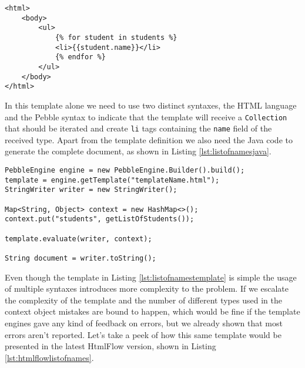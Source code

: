 \bigskip


\begin{minipage}{\linewidth}
\begin{lstlisting}[caption={List of Student Names Template - Pebble}, label={lst:listofnamestemplate}]
<html>
	<body>
	    <ul>
			{% for student in students %}
		  	<li>{{student.name}}</li>
			{% endfor %}
		</ul>  
  	</body>
</html>
\end{lstlisting}
\end{minipage} 

\noindent
In this template alone we need to use two distinct syntaxes, the \ac{HTML} language and the Pebble syntax to indicate that the template will receive a \texttt{Collection} that should be iterated  and create \texttt{li} tags containing the \texttt{name} field of the received type. Apart from the template definition we also need the Java code to generate the complete document, as shown in Listing \ref{lst:listofnamesjava}.

\bigskip


\begin{minipage}{\linewidth}
\begin{lstlisting}[caption={List of Names Pebble - Java}, label={lst:listofnamesjava}]
PebbleEngine engine = new PebbleEngine.Builder().build();
template = engine.getTemplate("templateName.html");
StringWriter writer = new StringWriter();

Map<String, Object> context = new HashMap<>();
context.put("students", getListOfStudents());

template.evaluate(writer, context);

String document = writer.toString();
\end{lstlisting}
\end{minipage} 

\noindent
Even though the template in Listing \ref{lst:listofnamestemplate} is simple the usage of multiple syntaxes introduces more complexity to the problem. If we escalate the complexity of the template and the number of different types used in the context object mistakes are bound to happen, which would be fine if the template engines gave any kind of feedback on errors, but we already shown that most errors aren't reported. Let's take a peek of how this same template would be presented in the latest HtmlFlow version, shown in Listing \ref{lst:htmlflowlistofnames}.

